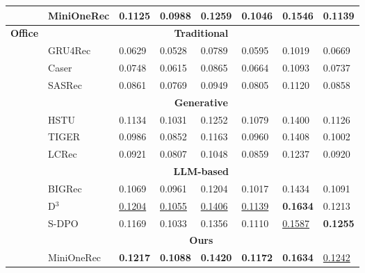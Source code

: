 \begin{table}[t]
{\begin{tabular}{clllllll}
                                      & MiniOneRec      & \textbf{0.1125} & \textbf{0.0988} & \textbf{0.1259} & \textbf{0.1046} & \textbf{0.1546} & \textbf{0.1139}  \\
                                      \hline
\multirow{14}{*}{\textbf{Office}}     & \multicolumn{7}{c}{\textbf{Traditional}}                          \\ \cline{2-8} 
                                      & GRU4Rec    & 0.0629 & 0.0528 & 0.0789 & 0.0595 & 0.1019 & 0.0669  \\
                                      & Caser      & 0.0748 & 0.0615 & 0.0865 & 0.0664 & 0.1093 & 0.0737  \\
                                      & SASRec     & 0.0861 & 0.0769 & 0.0949 & 0.0805 & 0.1120 & 0.0858  \\ \cline{2-8} 
                                      & \multicolumn{7}{c}{\textbf{Generative}}                           \\ \cline{2-8} 
                                      & HSTU       & 0.1134 & 0.1031 & 0.1252 & 0.1079 & 0.1400 & 0.1126  \\
                                      & TIGER      & 0.0986 & 0.0852 & 0.1163 & 0.0960 & 0.1408 & 0.1002  \\
                                      & LCRec      & 0.0921 & 0.0807 &    0.1048 & 0.0859 & 0.1237 & 0.0920  \\ \cline{2-8} 
                                      & \multicolumn{7}{c}{\textbf{LLM-based}}                            \\ \cline{2-8} 
                                      & BIGRec     & 0.1069 & 0.0961 & 0.1204 & 0.1017 & 0.1434 & 0.1091  \\
                                      & D$^{3}$         & \uline{0.1204} & \uline{0.1055} & \uline{0.1406} & \uline{0.1139} & \textbf{0.1634} & 0.1213  \\
                                      & S-DPO      & 0.1169 & 0.1033 & 0.1356 & 0.1110 & \uline{0.1587} & \textbf{0.1255}  \\ \cline{2-8} 
                                      & \multicolumn{7}{c}{\textbf{Ours}}                                 \\ \cline{2-8} 
                                      & MiniOneRec      & \textbf{0.1217} & \textbf{0.1088} & \textbf{0.1420} & \textbf{0.1172} & \textbf{0.1634} & \uline{0.1242}  \\
                                      \hline
\end{tabular}
}
\end{table}

